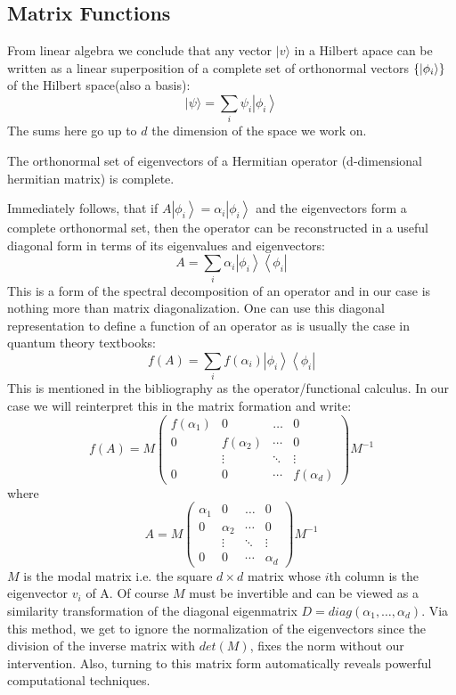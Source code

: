 \subsection{Matrix Functions}
From linear algebra we conclude that any vector $|v\rangle$ in a Hilbert apace can be written as a linear superposition of a complete set of orthonormal vectors $\{\ket{\phi_i}\}$ of the Hilbert space(also a basis):
$$|\psi\rangle=\sum_{i} \psi_{i}\left|\phi_{i}\right\rangle$$
The sums here go up to $d$ the dimension of the space we work on.
\begin{note}
The orthonormal set
of eigenvectors of a Hermitian operator (d-dimensional hermitian matrix) is complete.
\end{note}
Immediately follows, that if $A\left|\phi_{i}\right\rangle=\alpha_{i}\left|\phi_{i}\right\rangle$ and the eigenvectors form a complete orthonormal set, then the operator can be reconstructed in a useful diagonal form in terms of its eigenvalues and eigenvectors:
$$
A=\sum_{i} \alpha_{i}\left|\phi_{i}\right\rangle\left\langle\phi_{i}\right|
$$
This is a form of the spectral decomposition of an operator and in our case is nothing more than matrix diagonalization.
One can use this diagonal representation to define a function of an operator as is usually the case in quantum theory textbooks:
$$
f(A)=\sum_{i} f\left(\alpha_{i}\right)\left|\phi_{i}\right\rangle\left\langle\phi_{i}\right|
$$
This is mentioned in the bibliography as the operator/functional calculus. In our case we will reinterpret this in the matrix formation and write:
$$
f(A)=M\left(\begin{array}{cccc}
f\left(\alpha_{1}\right) & 0 & \ldots & 0 \\
0 & f\left(\alpha_{2}\right) & \cdots & 0 \\
& \vdots  & \ddots & \vdots \\
0 & 0 & \cdots & f\left(\alpha_{d}\right)
\end{array}\right) M^{-1}
$$
where 
$$A=M\left(\begin{array}{cccc}
\alpha_{1} & 0 & \ldots & 0 \\
0 & \alpha_{2} & \cdots & 0 \\
& \vdots & \ddots & \vdots \\
0 & 0 & \cdots & \alpha_{d}
\end{array}\right)M^{-1}$$
$M$ is the modal matrix i.e. the square $d \times d$ matrix whose $i$th column is the eigenvector $v_i$ of A. Of course $M$ must be invertible and can be viewed as a similarity transformation of the diagonal eigenmatrix $D=diag(\alpha_1,\dots,\alpha_d)$. Via this method, we get to ignore the normalization of the eigenvectors since the division of the inverse matrix with $det(M)$, fixes the norm without our intervention. Also, turning to this matrix form automatically reveals powerful computational techniques.
